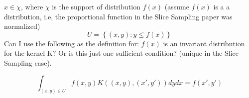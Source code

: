 \documentclass[10pt]{article}
\begin{document}
\large
\begingroup\makeatletter{}\check@mathfonts
$x \in \chi$, where $\chi$ is the support of distribution $f(x)$ (assume $f(x)$ is a a distribution, i.e, the proportional function in the Slice Sampling paper was normalized)
$$U = \left\{ (x,y): y \leq f(x) \right\}  $$
Can I use the following as the definition for: $f(x)$ is an invariant distribution for the kernel K? Or is this just one sufficient condition? (unique in the Slice Sampling case).

$$\int_{(x,y)\in U}f(x,y)K((x,y),(x',y'))dydx = f(x',y')$$
\endgroup
\end{document}
